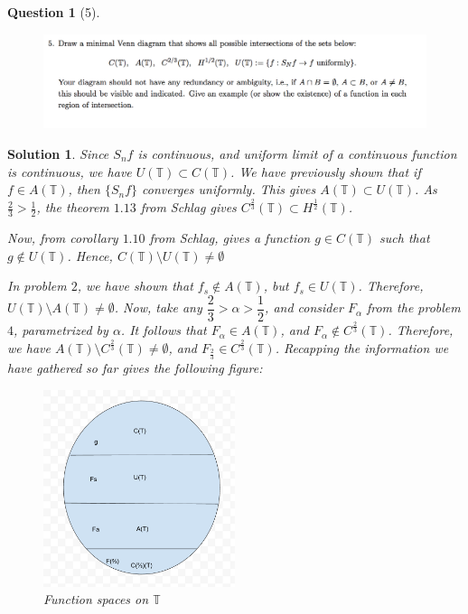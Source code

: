\documentclass{article} %
\theoremstyle{quest}
\newtheorem*{question}{Question}
\newtheorem*{solution}{Solution}
\begin{document}
\begin{question}[5]
\hfill
\begin{figure}[h!]
  \centering
    \includegraphics[width=1\textwidth]{HA-2-5.png}
\end{figure}
\end{question}
\begin{solution}
Since $S_n f $ is continuous, and uniform limit of a continuous function is continuous, we
have $U(\mathbb{T}) \subset C(\mathbb{T})$. We have previously shown that if $f \in A(\mathbb{T})$,
then $\{S_n f \}$ converges uniformly. This gives $A(\mathbb{T}) \subset U(\mathbb{T})$. As $\frac{2}{3}
> \frac{1}{2}$, the theorem $1.13$ from Schlag 
gives $C^{\frac{2}{3}}(\mathbb{T}) \subset H^{\frac{1}{2}}(\mathbb{T})$.


Now, from corollary $1.10$ from Schlag,
gives a function $g \in C(\mathbb{T})$ such that $g \not\in U(\mathbb{T})$. Hence,
$ C(\mathbb{T}) \setminus U(\mathbb{T}) \neq \emptyset$
 
In problem $2$, we have shown that $f_s \notin A(\mathbb{T})$, but $f_s \in U(\mathbb{T})$. Therefore,
$U(\mathbb{T}) \setminus A(\mathbb{T}) \neq \emptyset$. Now, take any $\dfrac{2}{3} >\alpha > \dfrac{1}{2}$,
and consider $F_{\alpha}$ from the problem $4$, parametrized by $\alpha$. It follows that $F_{\alpha}
\in A(\mathbb{T})$, and $F_{\alpha} \not\in C^{\frac{2}{3}}(\mathbb{T})$. Therefore, we have 
$A(\mathbb{T}) \setminus C^{\frac{2}{3}}(\mathbb{T}) \neq \emptyset$, and $F_{\frac{2}{3}} \in C^{\frac{2}{3}}
(\mathbb{T})$. Recapping the information we have
gathered so far gives the following figure:
\begin{figure}[!ht]
  \caption{Function spaces on $\mathbb{T}$}
  \centering
    \includegraphics[width=0.5\textwidth]{fspace-1}
\end{figure}


\end{solution}
\end{document}
